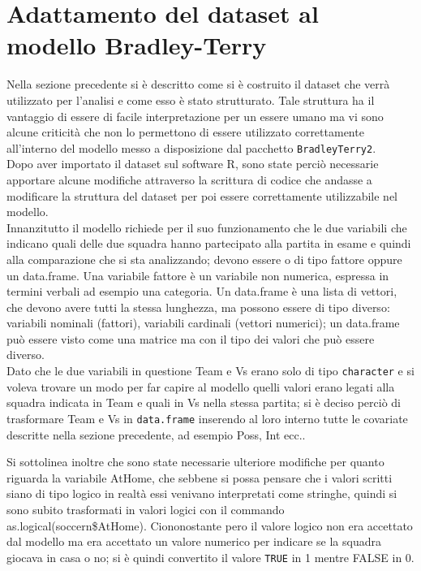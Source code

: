 \section{Adattamento del dataset al modello Bradley-Terry}
Nella sezione precedente si è descritto come si è costruito il dataset che verrà utilizzato per l'analisi e come esso è stato strutturato. Tale struttura ha il vantaggio di essere di facile interpretazione per un essere umano ma vi sono alcune criticità che non lo permettono di essere utilizzato correttamente all'interno del modello messo a disposizione dal pacchetto \texttt{BradleyTerry2}.\\ Dopo aver importato il dataset sul software R, sono state perciò necessarie apportare alcune modifiche attraverso la scrittura di codice che andasse a modificare la struttura del dataset per poi essere correttamente utilizzabile nel modello. \\

Innanzitutto il modello richiede per il suo funzionamento che le due variabili che indicano quali delle due squadra hanno partecipato alla partita in esame e quindi alla comparazione che si sta analizzando; devono essere o di tipo fattore oppure un \textsf{data.frame}. Una variabile fattore è un variabile non numerica, espressa in termini verbali ad esempio una categoria. Un \textsf{data.frame} è una lista di vettori, che devono avere tutti la stessa lunghezza, ma possono essere di tipo diverso: variabili nominali (fattori), variabili cardinali (vettori numerici); un \textsf{data.frame} può essere visto come una matrice ma con il tipo dei valori che può essere diverso.\\ Dato che le due variabili in questione \textsf{Team} e \textsf{Vs} erano solo di tipo \texttt{character} e si voleva trovare un modo per far capire al modello quelli valori erano legati alla squadra indicata in \textsf{Team} e quali in \textsf{Vs} nella stessa partita; si è deciso perciò di trasformare \textsf{Team} e \textsf{Vs} in \texttt{data.frame} inserendo al loro interno tutte le covariate descritte nella sezione precedente, ad esempio \textsf{Poss}, \textsf{Int} ecc..

Si sottolinea inoltre che sono state necessarie ulteriore modifiche per quanto riguarda la variabile \textsf{AtHome}, che sebbene si possa pensare che i valori scritti siano di tipo logico in realtà essi venivano interpretati come stringhe, quindi si sono subito trasformati in valori logici con il commando \textsf{as.logical(soccern\$AtHome)}. Ciononostante pero il valore logico non era accettato dal modello ma era accettato un valore numerico per indicare se la squadra giocava in casa o no; si è quindi convertito il valore \texttt{TRUE} in 1 mentre FALSE in 0. 

